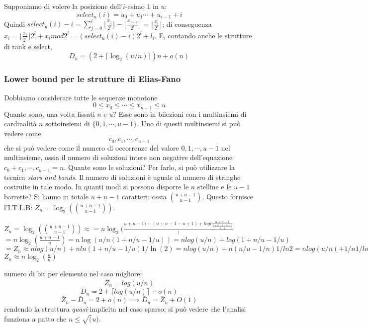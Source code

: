 Supponiamo di volere la posizione dell'$i$-esimo $1$ in $u$:
$$
	select_u(i) = u_0 + u_1 \cdots + u_{i-1} + i
$$
Quindi $ select_u(i) - i = \sum_{j = 0}^i \lfloor{\frac{x_{j}}{2^l}}\rfloor -\lfloor{\frac{x_{j-1}}{2^l}}\rfloor  = \lfloor \frac{x_i}{2^l} \rfloor$;
di conseguenza $x_i =  \lfloor \frac{x_i}{2^l} \rfloor 2^l + x_i mod 2^l = (select_u(i) - i ) 2^l + l_i$.
E, contando anche le strutture di rank e select,
$$
	D_n = (2 + \lceil \log_2(u/n) \rceil)n + o(n)
$$

\subsubsection{Lower bound per le strutture di Elias-Fano}
Dobbiamo considerare tutte le sequenze monotone
$$
	0 \leq x_0 \leq \cdots \leq x_{n-1} \leq u
$$
Quante sono, una volta fissati $n$ e $u$? Esse sono in biiezioni con i multinsiemi di cardinalità
$n$ sottoinsiemi di $\{0,1, \cdots, u-1\}$. Uno di questi multinsiemi si può vedere come
$$
	c_0, c_1, \cdots, c_{u-1}
$$
che si può vedere come il numero di occorrenze del valore $0, 1, \cdots, u-1$ nel multinsieme, ossia
il numero di soluzioni intere non negative dell'equazione $c_0 + c_1, \cdots, c_{u-1} = n$. Quante sono le
soluzioni? Per farlo, si può utilizzare la tecnica \textit{stars and bands}.  Il numero di soluzioni
è uguale al numero di stringhe costruite in tale modo. In quanti modi si possono disporre le
$n$ stelline e le $u-1$ barrette? Si hanno in totale $u + n -1 $ caratteri; ossia ${u + n -1}\choose{u - 1}$.
Questo fornisce l'I.T.L.B:
$Z_n = \log_2({{u + n -1}\choose{u - 1}})$.
%

$Z_n = \log_2({{u + n -1}\choose{u - 1}}) \approx = n \log_2(\frac{u + n -1) + (u + n -1 - u + 1) + log(\frac{u + n - 1}{\frac{u + n -1-u + 1}{u -1}}})$
$= n \log_2(\frac{u + n - 1}{n}) = n \log(u/n(1 + n/u - 1/u)) = n log(u/n) + log(1 + n/u - 1/u)$
$= Z_n \approx n log(u/n) + n ln(1 + n/u - 1/u) {1/\ln(2)} = n log (u/n) + n (n/u - 1/n) 1/ln2 = n log(u/n( + 1/n 1/log2) - n/u 1(ln2))$
$ Z_n \approx n \log_2(\frac{u}{n})$


numero di bit per elemento nel caso migliore:
$$
	\bar{Z}_n = log (u/n)
$$
$$
	\bar{D}_n = 2 + \lceil log(u/n) \rceil + o(n)
$$
$$
	\bar{Z}_n - \bar{D}_n = 2 + o(n) \implies \bar{D}_n = \bar{Z}_n + O(1)
$$
rendendo la struttura \textit{quasi}-implicita nel caso sparso; si può vedere che l'analisi funziona a patto che
$n \leq \sqrt(u)$.

